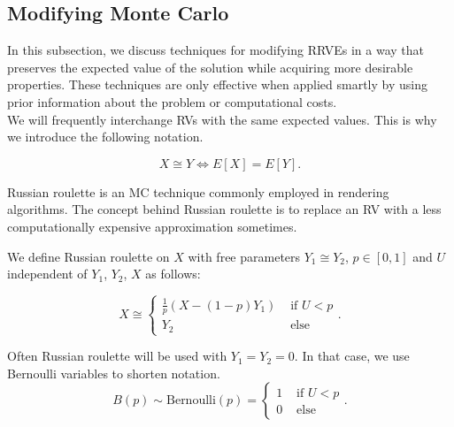 \documentclass[a4paper,12pt]{article}
\begin{document}

\subsection{Modifying Monte Carlo}

In this subsection, we discuss techniques for modifying RRVEs
in a way that preserves the expected value of the solution while
acquiring more desirable properties. These techniques are only
effective when applied smartly by using prior information
about the problem or computational costs. \\

We will frequently interchange RVs with the same expected values.
This is why we introduce the following notation.
\begin{notation}[$\cong$]
    \[
        X \cong Y \iff E[X]=E[Y]
        .\]
\end{notation}

Russian roulette is an MC technique commonly employed in rendering algorithms.
The concept behind Russian roulette is to replace an RV with a
less computationally expensive approximation sometimes.

\begin{definition} \label{Russian roulette}
    We define Russian roulette on $X$ with free parameters
    $Y_{1} \cong Y_{2}$, $p \in [0,1]$
    and $U$ independent of $Y_{1}$, $Y_{2}$, $X$
    as follows:

    \begin{equation}
        X \cong
        \begin{cases}
            \frac{1}{p}(X - (1-p)Y_{1}) & \text{ if } U < p \\
            Y_{2}                       & \text{ else }
        \end{cases}.
    \end{equation}
\end{definition}


\begin{notation}[$B(p)$]
    Often Russian roulette will be used with $Y_{1}= Y_{2}= 0$.
    In that case, we use Bernoulli variables to shorten notation.
    \begin{equation}
        B(p) \sim \text{Bernoulli}(p) =
        \begin{cases}
            1 & \text{ if } U<p \\
            0 & \text{ else }
        \end{cases} .
    \end{equation}
\end{notation}
\end{document}
